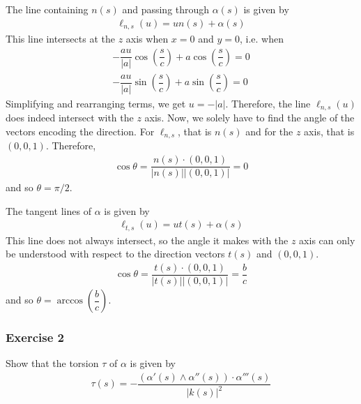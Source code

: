 \documentclass{article}
\begin{document}
	The line containing $n(s)$ and passing through $\alpha(s)$ is given by
	\begin{gather*}
		\ell_{n,s}(u) = u n(s) + \alpha(s)
	\end{gather*}
	This line intersects at the $z$ axis when $x = 0$ and $y = 0$, i.e. when
	\begin{gather*}
		-\dfrac{au}{|a|} \cos \left( \dfrac{s}{c} \right) + a \cos \left( \dfrac{s}{c} \right) = 0 \\
		-\dfrac{au}{|a|} \sin \left( \dfrac{s}{c} \right) + a \sin \left( \dfrac{s}{c} \right) = 0
	\end{gather*}
	Simplifying and rearranging terms, we get $u = -|a|$. Therefore, the line $\ell_{n,s}(u)$ does indeed intersect with the $z$ axis. Now, we solely have to find the angle of the vectors encoding the direction. For $\ell_{n,s}$, that is $n(s)$ and for the $z$ axis, that is $(0, 0, 1)$. Therefore,
	\begin{gather*}
		\cos \theta = \dfrac{n(s) \cdot (0, 0, 1)}{|n(s)||(0, 0, 1)|} = 0
	\end{gather*}
	and so $\theta = \pi/2$.
	
	The tangent lines of $\alpha$ is given by
	\begin{gather*}
		\ell_{t,s}(u) = ut(s) + \alpha(s)
	\end{gather*}
	This line does not always intersect, so the angle it makes with the $z$ axis can only be understood with respect to the direction vectors $t(s)$ and $(0, 0, 1)$.
	\begin{gather*}
		\cos \theta = \dfrac{t(s) \cdot (0, 0, 1)}{|t(s)||(0, 0, 1)|} = \dfrac{b}{c}
	\end{gather*}
	and so $\theta = \arccos \left(\dfrac{b}{c}\right)$.
	
	\subsubsection*{Exercise 2}
	Show that the torsion $\tau$ of $\alpha$ is given by
	\begin{gather*}
		\tau(s) = - \dfrac{ (\alpha'(s) \wedge \alpha''(s)) \cdot \alpha'''(s) }{ |k(s)|^2 }
	\end{gather*}
	
\end{document}
